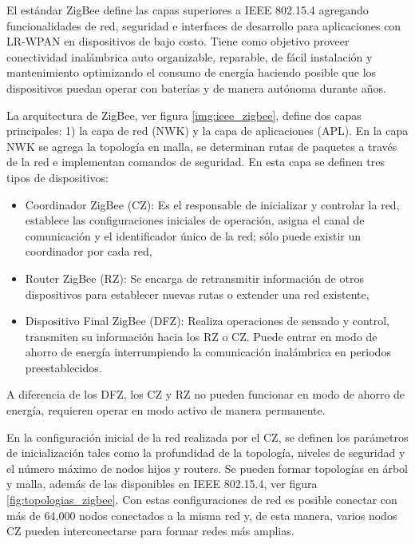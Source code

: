 El estándar ZigBee define las capas superiores a IEEE 802.15.4 agregando funcionalidades de red, seguridad e interfaces de desarrollo para aplicaciones con LR-WPAN en dispositivos de bajo costo. Tiene como objetivo proveer conectividad inalámbrica auto organizable, reparable, de fácil instalación y mantenimiento optimizando el consumo de energía haciendo posible que los dispositivos puedan operar con baterías y de manera autónoma durante años.

La arquitectura de ZigBee, ver figura \ref{img:ieee_zigbee}, define dos capas principales: 1) la capa de red (NWK) y la capa de aplicaciones (APL). En la capa NWK se agrega la topología en malla, se determinan rutas de paquetes a través de la red e implementan comandos de seguridad. En esta capa se definen tres tipos de dispositivos: 

\begin{itemize}
	\item Coordinador ZigBee (CZ): Es el responsable de inicializar y controlar la red, establece las configuraciones iniciales de operación, asigna el canal de comunicación y el identificador único de la red; sólo puede existir un coordinador por cada red, 
	\item Router ZigBee (RZ): Se encarga de retransmitir información de otros dispositivos para establecer nuevas rutas o extender una red existente, 
	\item Dispositivo Final ZigBee (DFZ): Realiza operaciones de sensado y control, transmiten su información hacia los RZ o CZ. Puede entrar en modo de ahorro de energía interrumpiendo la comunicación inalámbrica en periodos preestablecidos. 
\end{itemize}
	
A diferencia de los DFZ, los CZ y RZ no pueden funcionar en modo de ahorro de energía, requieren operar en modo activo de manera permanente. 

En la configuración inicial de la red realizada por el CZ, se definen los parámetros de inicialización tales como la profundidad de la topología, niveles de seguridad y el número máximo de nodos hijos y routers. Se pueden formar topologías en árbol y malla, además de las disponibles en IEEE 802.15.4, ver figura \ref{fig:topologias_zigbee}. Con estas configuraciones de red es posible conectar con más de 64,000 nodos conectados a la misma red y, de esta manera, varios nodos CZ pueden interconectarse para formar redes más amplias.  

